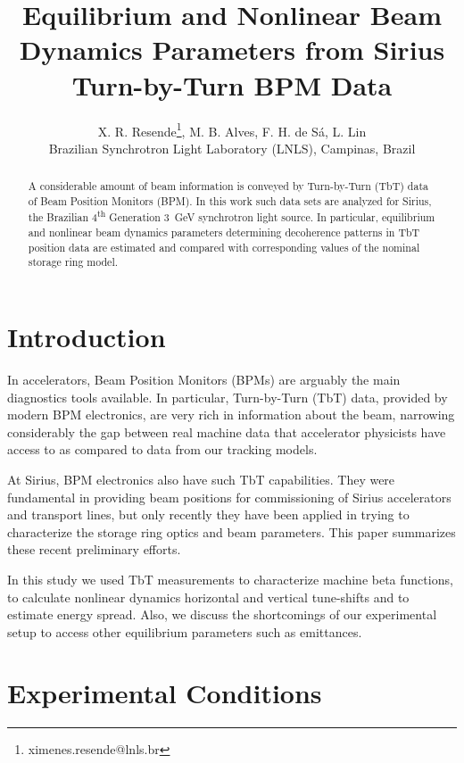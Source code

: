 \documentclass[a4paper,
               keeplastbox,   %
               ]{jacow}
\begin{document}
\title{Equilibrium and Nonlinear Beam Dynamics Parameters from Sirius Turn-by-Turn BPM Data}

\author{X. R. Resende\thanks{ximenes.resende@lnls.br}, M. B. Alves, F. H. de Sá, L. Lin \\ Brazilian Synchrotron Light Laboratory (LNLS), Campinas, Brazil}

\maketitle

\begin{abstract}
A considerable amount of beam information is conveyed by Turn-by-Turn (TbT) data of Beam Position Monitors (BPM). In this work such data sets are analyzed for Sirius, the Brazilian 4\textsuperscript{th} Generation \SI{3}{GeV} synchrotron light source. In particular, equilibrium and nonlinear beam dynamics parameters determining decoherence patterns in TbT position data are estimated and compared with corresponding values of the nominal storage ring model.
\end{abstract}

\section{Introduction}

In accelerators, Beam Position Monitors (BPMs) are arguably the main diagnostics tools available. In particular, Turn-by-Turn (TbT) data, provided by modern BPM electronics, are very rich in information about the beam, narrowing considerably the gap between real machine data that accelerator physicists have access to as compared to data from our tracking models.

At Sirius, BPM electronics also have such TbT capabilities\cite{Marques:IBIC18-TUOC03}. They were fundamental in providing beam positions for commissioning of Sirius accelerators and transport lines\cite{ipac21-status}, but only recently they have been applied in trying to characterize the storage ring optics and beam parameters. This paper summarizes these recent preliminary efforts.

In this study we used TbT measurements to characterize machine beta functions, to calculate nonlinear dynamics horizontal and vertical tune-shifts and to estimate energy spread. Also, we discuss the shortcomings of our experimental setup to access other equilibrium parameters such as emittances.

\section{Experimental Conditions}
\end{document}
